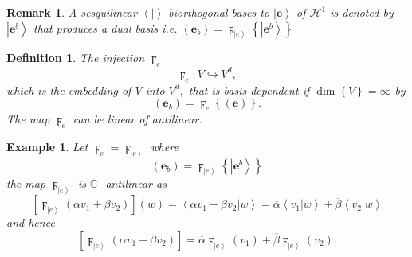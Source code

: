 \documentclass[aps,preprint]{revtex4}%
\newtheorem{definition}[theorem]{Definition}
\newtheorem{example}[theorem]{Example}
\newtheorem{remark}[theorem]{Remark}
\begin{document}
\begin{remark}
A sesquilinear $\left\langle \left.  {}\right\vert \right\rangle
$-biorthogonal bases to $\left\vert \mathbf{e}\right\rangle $ of
$\mathcal{H}^{1}$ is denoted by $\left\vert \mathbf{e}^{b}\right\rangle $ that
produces a dual basis i.e. $\left(  \mathbf{e}_{b}\right)  =\digamma
_{\left\vert e\right\rangle }\left\{  \left\vert \mathbf{e}^{b}\right\rangle
\right\}  $
\end{remark}

\begin{definition}
The injection $\digamma_{e}$
\begin{equation}
\digamma_{e}:V\hookrightarrow V^{d},
\end{equation}
which is the embedding of $V$ into $V^{d},$ that is basis dependent if
$\dim\left\{  V\right\}  =\infty$ by
\begin{equation}
\left(  \mathbf{e}_{b}\right)  =\digamma_{e}\left\{  \left(  \mathbf{e}%
\right)  \right\}  .
\end{equation}
The map $\digamma_{e}$ can be linear of antilinear.
\end{definition}

\begin{example}
Let $\digamma_{e}=\digamma_{\left\vert e\right\rangle }$ where
\begin{equation}
\left(  \mathbf{e}_{b}\right)  =\digamma_{\left\vert e\right\rangle }\left\{
\left\vert \mathbf{e}^{b}\right\rangle \right\}
\end{equation}
the map $\digamma_{\left\vert e\right\rangle }$ is $\mathbb{C}$%
-\emph{antilinear} as
\begin{equation}
\left[  \digamma_{\left\vert e\right\rangle }\left(  \alpha v_{1}+\beta
v_{2}\right)  \right]  \left(  w\right)  =\left\langle \left.  \alpha
v_{1}+\beta v_{2}\right\vert w\right\rangle =\overline{\alpha}\left\langle
\left.  v_{1}\right\vert w\right\rangle +\overline{\beta}\left\langle \left.
v_{2}\right\vert w\right\rangle
\end{equation}
and hence
\begin{equation}
\left[  \digamma_{\left\vert e\right\rangle }\left(  \alpha v_{1}+\beta
v_{2}\right)  \right]  =\overline{\alpha}\digamma_{\left\vert e\right\rangle
}\left(  v_{1}\right)  +\overline{\beta}\digamma_{\left\vert e\right\rangle
}\left(  v_{2}\right)  .
\end{equation}

\end{example}
\end{document}

